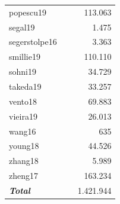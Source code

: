 \begin{table}[ht!]
\begin{tabular}{l|c|r}
popescu19 & ~\citep{popescu_decoding_2019} & 113.063  \\

segal19 & ~\citep{segal_single_2019} & 1.475  \\

segerstolpe16 & ~\citep{segerstolpe_single-cell_2016} & 3.363  \\

smillie19 & ~\citep{smillie_intra-_2019} & 110.110  \\

sohni19 & ~\citep{sohni_neonatal_2019} & 34.729  \\

takeda19 & ~\citep{takeda_single-cell_2019} & 33.257  \\

vento18 & ~\citep{vento-tormo_single-cell_2018} & 69.883  \\

vieira19 & ~\citep{braga_cellular_2019} & 26.013  \\

wang16 & ~\citep{wang_single-cell_2016} & 635  \\

young18 & ~\citep{young_single-cell_2018} & 44.526  \\

zhang18 & ~\citep{zhang_lineage_2018} & 5.989  \\

zheng17 & ~\citep{zheng_massively_2017} & 163.234  \\
\midrule
\textbf{\textit{Total}} &  & 1.421.944  \\

\bottomrule
\end{tabular}
\end{table}


